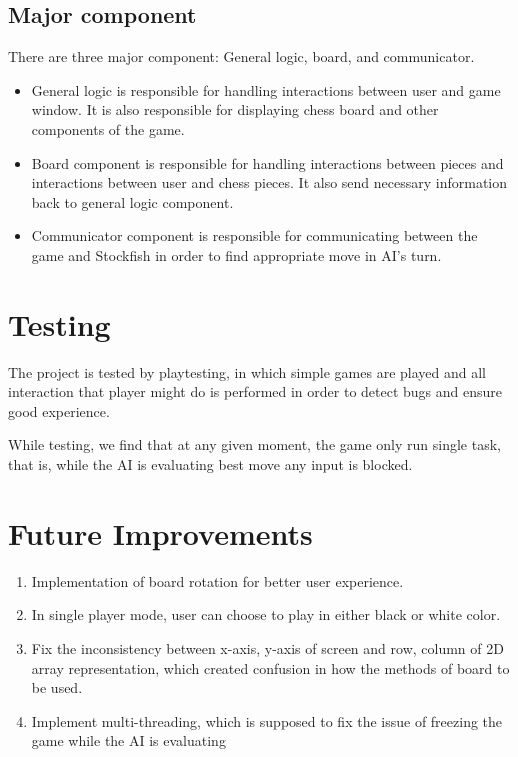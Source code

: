 \documentclass[a4paper, 10pt, titlepage]{report}
\begin{document}
\section{Major component}
There are three major component: General logic, board, and communicator.
\begin{itemize}
  \item General logic is responsible for handling interactions between user and game window. It is also responsible for displaying chess board and other components of the game.
  \item Board component is responsible for handling interactions between pieces and interactions between user and chess pieces. It also send necessary information back to general logic component.
  \item Communicator component is responsible for communicating between the game and Stockfish in order to find appropriate move in AI's turn.
\end{itemize}
\chapter{Testing}

The project is tested by playtesting, in which simple games are played and all interaction that player might do is performed in order to detect bugs and ensure good experience.

While testing, we find that at any given moment, the game only run single task, that is, while the AI is evaluating best move any input is blocked. 

\chapter{Future Improvements}
\begin{enumerate}
  \item Implementation of board rotation for better user experience.
  \item In single player mode, user can choose to play in either black or white color.
  \item Fix the inconsistency between x-axis, y-axis of screen and row, column of 2D array representation, which created confusion in how the methods of board to be used. 
  \item Implement multi-threading, which is supposed to fix the issue of freezing the game while the AI is evaluating
\end{enumerate}
\end{document}

